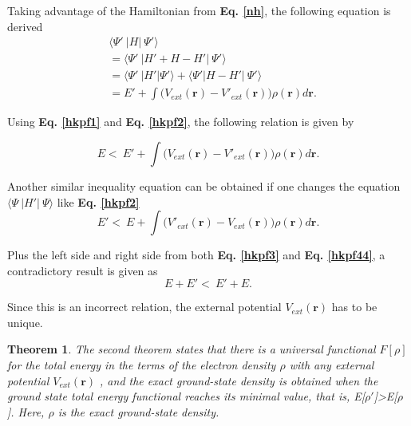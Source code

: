 \documentclass[a4paper, 12pt, titlepage,oneside,drop]{kthesis}
\newtheorem{thm}{Theorem}
\begin{document}
Taking advantage of the Hamiltonian from \textbf{Eq. \ref{nh}}, the following equation is derived
\begin{equation}\label{hkpf2}\begin{split}
&    \langle \Psi'\ |{H}|\ \Psi' \rangle \\
&  = \langle \Psi'\ |{H'} + {H} - {H'}|\ \Psi' \rangle \\
&  = \langle \Psi'\ |{H'} |\Psi' \rangle + \langle \Psi' | {H} - {H'}|\ \Psi' \rangle \\
&  = E' + \int \Big( V_{ext}(\textbf{r}) - V'_{ext}(\textbf{r}) \Big)  \rho(\textbf{r}) d \textbf{r}.
\end{split}\end{equation}

Using \textbf{Eq. \ref{hkpf1}} and \textbf{Eq. \ref{hkpf2}}, the following relation is given by

\begin{equation}\label{hkpf3}
 E  < \  E' + \int \Big( V_{ext}(\textbf{r}) - V'_{ext}(\textbf{r}) \Big)  \rho(\textbf{r}) d \textbf{r} .
\end{equation}

Another similar inequality equation can be obtained if one changes the equation $\langle \Psi\ |{H'}|\ \Psi \rangle$ like \textbf{Eq. \ref{hkpf2}}
\begin{equation}\label{hkpf44}
  E'  < \  E + \int \Big( V'_{ext}(\textbf{r}) - V_{ext}(\textbf{r}) \Big)  \rho(\textbf{r}) d \textbf{r} .
\end{equation}

Plus the left side and right side from both \textbf{Eq. \ref{hkpf3}} and \textbf{Eq. \ref{hkpf44}}, a contradictory result is given as
\begin{equation}\label{hkpf4}
  E + E'  < \  E' + E.
\end{equation}

Since this is an incorrect relation, the external potential $V_{ext}(\textbf{r})$ has to be unique.

\begin{thm}
\label{hk2}
\noindent The second theorem states that there is a universal functional $F[\rho]$ for the total energy in the terms of the electron density $\rho$ with any external potential $V_{ext}(\textbf{r})$ ,
and the exact ground-state density is obtained when the ground state total energy functional reaches its minimal value, that is, E[$\rho'$]>E[$\rho$]. Here, $\rho$ is the exact ground-state density.
\end{thm}
\end{document}
